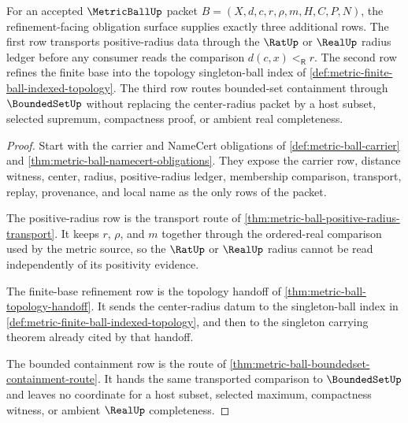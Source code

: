 \begin{theorem}
\label{thm:metric-ball-refinement-obligations}
For an accepted $\MetricBallUp$ packet $B=(X,d,c,r,\rho,m,H,C,P,N)$, the refinement-facing obligation surface supplies exactly three additional rows. The first row transports positive-radius data through the $\RatUp$ or $\RealUp$ radius ledger before any consumer reads the comparison $d(c,x)<_{\mathsf R}r$. The second row refines the finite base into the topology singleton-ball index of \autoref{def:metric-finite-ball-indexed-topology}. The third row routes bounded-set containment through $\BoundedSetUp$ without replacing the center-radius packet by a host subset, selected supremum, compactness proof, or ambient real completeness.
\end{theorem}
\begin{proof}
Start with the carrier and NameCert obligations of \autoref{def:metric-ball-carrier} and \autoref{thm:metric-ball-namecert-obligations}. They expose the carrier row, distance witness, center, radius, positive-radius ledger, membership comparison, transport, replay, provenance, and local name as the only rows of the packet.

The positive-radius row is the transport route of \autoref{thm:metric-ball-positive-radius-transport}. It keeps $r$, $\rho$, and $m$ together through the ordered-real comparison used by the metric source, so the $\RatUp$ or $\RealUp$ radius cannot be read independently of its positivity evidence.

The finite-base refinement row is the topology handoff of \autoref{thm:metric-ball-topology-handoff}. It sends the center-radius datum to the singleton-ball index in \autoref{def:metric-finite-ball-indexed-topology}, and then to the singleton carrying theorem already cited by that handoff.

The bounded containment row is the route of \autoref{thm:metric-ball-boundedset-containment-route}. It hands the same transported comparison to $\BoundedSetUp$ and leaves no coordinate for a host subset, selected maximum, compactness witness, or ambient $\RealUp$ completeness.
\end{proof}

